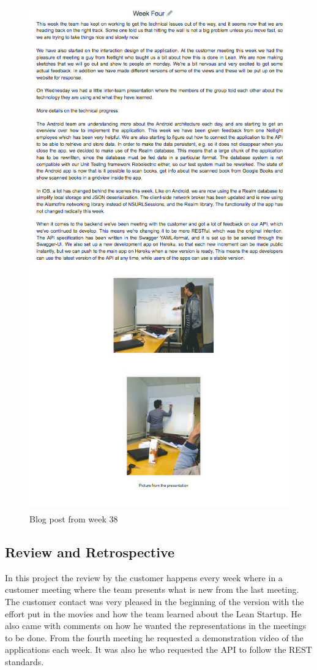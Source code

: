 \begin{figure}
\centering
\includegraphics[height=22cm]{figs/v01/WeekFour.jpg}
\caption{Blog post from week 38}
\label{fig:week-four}
\end{figure}

\newpage
\subsection{Review and Retrospective}

In this project the review by the customer happens every week where in a customer meeting where the team presents what is new from the last meeting. The customer contact was very pleased in the beginning of the version with the effort put in the movies and how the team learned about the Lean Startup. He also came with comments on how he wanted the representations in the meetings to be done. From the fourth meeting he requested a demonstration video of the applications each week. It was also he who requested the \gls{API} to follow the REST standards. 

